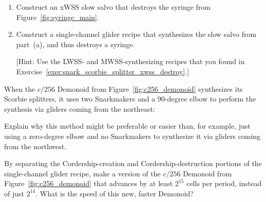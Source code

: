 \begin{multicols}{2}
\begin{problem}
		\begin{enumerate}[label=\bf\color{ocre}(\alph*)]
			\item Construct an xWSS slow salvo that destroys the syringe from Figure~\ref{fig:syringe_main}.
			
			\item Construct a single-channel glider recipe that synthesizes the slow salvo from part~(a), and thus destroys a syringe.
			
			[Hint: Use the LWSS- and MWSS-synthesizing recipes that you found in Exercise~\ref{exer:snark_scorbie_splitter_xwss_destroy}.]
		\end{enumerate}
	\end{problem}
	
	
	\mfilbreak
	
	
	\begin{problemstar}\label{exer:why_scorbie_splitter_snarkmakers} 
		When the $c/256$ Demonoid from Figure~\ref{fig:c256_demonoid} synthesizes its Scorbie splitters, it uses two Snarkmakers and a 90-degree elbow to perform the synthesis via gliders coming from the northeast:
		
		\noindent\begin{center}
		\end{center}
		
		\noindent Explain why this method might be preferable or easier than, for example, just using a zero-degree elbow and no Snarkmakers to synthesize it via gliders coming from the northwest.
	\end{problemstar}
	
	
	\mfilbreak
	
	
	\begin{problem}\label{exer:middling_demonoid_faster} 
		By separating the Cordership-creation and Cordership-destruction portions of the single-channel glider recipe, make a version of the $c/256$ Demonoid from Figure~\ref{fig:c256_demonoid} that advances by at least $2^{15}$ cells per period, instead of just $2^{14}$. What is the speed of this new, faster Demonoid?
		
	\end{problem}
	

\end{multicols}
